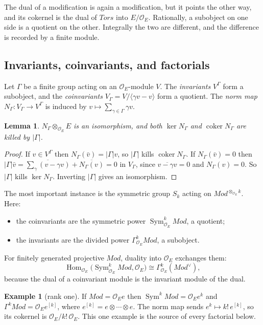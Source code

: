 \documentclass[11pt]{amsart}
\newtheorem{lemma}[theorem]{Lemma}
\theoremstyle{definition}
\newtheorem{example}[theorem]{Example}
\theoremstyle{remark}
\newcommand{\OEring}{\mathcal{O}_E}
\newcommand{\Md}{\mathit{Mod}}
\newcommand{\Tors}{\mathit{Tors}}
\DeclareMathOperator{\Hom}{Hom}
\DeclareMathOperator{\Sym}{Sym}
\DeclareMathOperator{\coker}{coker}
\newcommand{\dual}{^{\vee}}
\begin{document}
The dual of a modification is again a modification, but it points the other way, and its cokernel is the dual of $\Tors$ into $E/\OEring$. Rationally, a subobject on one side is a quotient on the other. Integrally the two are different, and the difference is recorded by a finite module.

\subsection{Invariants, coinvariants, and factorials}
Let $\Gamma$ be a finite group acting on an $\OEring$-module $V$. The \emph{invariants} $V^{\Gamma}$ form a subobject, and the \emph{coinvariants} $V_{\Gamma}=V/\langle \gamma v-v\rangle$ form a quotient. The \emph{norm map} $N_\Gamma\colon V_\Gamma\to V^\Gamma$ is induced by $v\mapsto\sum_{\gamma\in\Gamma}\gamma v$.

\begin{lemma}\label{lem:norm-map}
$N_\Gamma\otimes_{\OEring}E$ is an isomorphism, and both $\ker N_\Gamma$ and $\coker N_\Gamma$ are killed by $|\Gamma|$.
\end{lemma}

\begin{proof}
If $v\in V^\Gamma$ then $N_\Gamma(\bar v)=|\Gamma|v$, so $|\Gamma|$ kills $\coker N_\Gamma$. If $N_\Gamma(\bar v)=0$ then $|\Gamma|\bar v=\overline{\sum_\gamma(v-\gamma v)}+\overline{N_\Gamma(v)}=0$ in $V_\Gamma$, since $\overline{v-\gamma v}=0$ and $N_\Gamma(v)=0$. So $|\Gamma|$ kills $\ker N_\Gamma$. Inverting $|\Gamma|$ gives an isomorphism.
\end{proof}

The most important instance is the symmetric group $S_k$ acting on $\Md^{\otimes_{\OEring}k}$. Here:
\begin{itemize}
\item the coinvariants are the symmetric power $\Sym^k_{\OEring}\Md$, a quotient;
\item the invariants are the divided power $\Gamma^k_{\OEring}\Md$, a subobject.
\end{itemize}
For finitely generated projective $\Md$, duality into $\OEring$ exchanges them:
\begin{equation}\label{eq:sym-gamma}
\Hom_{\OEring}\bigl(\Sym^k_{\OEring}\Md,\OEring\bigr)\cong\Gamma^k_{\OEring}(\Md\dual),
\end{equation}
because the dual of a coinvariant module is the invariant module of the dual.

\begin{example}[rank one]\label{ex:rank-one}
If $\Md=\OEring e$ then $\Sym^k\Md=\OEring e^k$ and $\Gamma^k\Md=\OEring e^{[k]}$, where $e^{[k]}=e\otimes\cdots\otimes e$. The norm map sends $e^k\mapsto k!\,e^{[k]}$, so its cokernel is $\OEring/k!\,\OEring$. This one example is the source of every factorial below.
\end{example}
\end{document}
